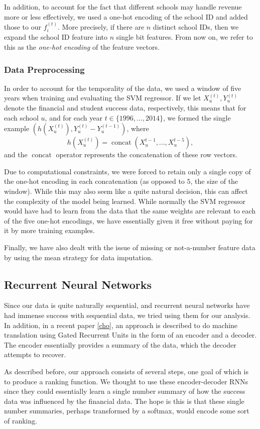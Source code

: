 \documentclass[paper.tex]{subfiles}
\begin{document}
In addition, to account for the fact that different schools may handle revenue more or less effectively, we used a one-hot encoding of the school ID and added those to our $f_i^{(t)}$. More precisely, if there are $n$ distinct school IDs, then we expand the school ID feature into $n$ single bit features. From now on, we refer to this as the \emph{one-hot encoding} of the feature vectors. 
\subsubsection{Data Preprocessing}
In order to account for the temporality of the data, we used a window of five years when training and evaluating the SVM regressor. If we let $X_u^{(t)}, Y_u^{(t)}$ denote the financial and student success data, respectively, this means that for each school $u$, and for each year $t \in \{1996, ..., 2014\}$, we formed the single example $(h(X_u^{(t)}), Y_u^{(t)} - Y_u^{(t - 1)})$, where \[ h(X_u^{(t)}) = \operatorname{concat}(X_u^{t - 1}, ..., X_u^{t - 5}), \] and the $\operatorname{concat}$ operator represents the concatenation of these row vectors. 

Due to computational constraints, we were forced to retain only a single copy of the one-hot encoding in each concatenation (as opposed to $5$, the size of the window). While this may also seem like a quite natural decision, this can affect the complexity of the model being learned. While normally the SVM regressor would have had to learn from the data that the same weights are relevant to each of the five one-hot encodings, we have essentially given it free without paying for it by more training examples. 

Finally, we have also dealt with the issue of missing or not-a-number feature data by using the mean strategy for data imputation.


\subsection{Recurrent Neural Networks} Since our data is quite naturally sequential, and recurrent neural networks have had immense success with sequential data, we tried using them for our analysis. In addition, in a recent paper \ref{cho}, an approach is described to do machine translation using Gated Recurrent Units in the form of an encoder and a decoder. The encoder essentially provides a summary of the data, which the decoder attempts to recover.

As described before, our approach consists of several steps, one goal of which is to produce a ranking function. We thought to use these encoder-decoder RNNs since they could essentially learn a single number summary of how the success data was influenced by the financial data. The hope is this is that these single number summaries, perhaps transformed by a softmax, would encode some sort of ranking.  
\end{document}
